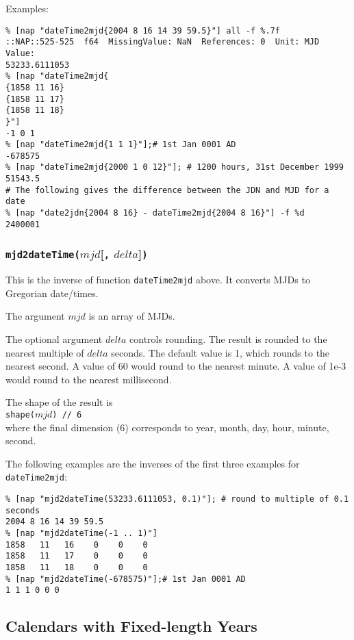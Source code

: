 Examples:
      \begin{verbatim}
% [nap "dateTime2mjd{2004 8 16 14 39 59.5}"] all -f %.7f
::NAP::525-525  f64  MissingValue: NaN  References: 0  Unit: MJD
Value:
53233.6111053
% [nap "dateTime2mjd{
{1858 11 16}
{1858 11 17}
{1858 11 18}
}"]
-1 0 1
% [nap "dateTime2mjd{1 1 1}"];# 1st Jan 0001 AD
-678575
% [nap "dateTime2mjd{2000 1 0 12}"]; # 1200 hours, 31st December 1999
51543.5
# The following gives the difference between the JDN and MJD for a date
% [nap "date2jdn{2004 8 16} - dateTime2mjd{2004 8 16}"] -f %d
2400001
\end{verbatim}

\subsubsection{\texttt{mjd2dateTime(}$mjd$[\texttt{,} $delta$]\texttt{)}}
        \label{date-function-mjd2dateTime}

This is the inverse of function 
      \texttt{dateTime2mjd} above. It converts MJDs to Gregorian
      date/times.
      

The argument 
      $mjd$ is an array of MJDs.
      

The optional argument 
      $delta$ controls rounding. The result is rounded to the
      nearest multiple of 
      $delta$ seconds. The default value is 1, which rounds to
      the nearest second. A value of 60 would round to the nearest
      minute. A value of 1e-3 would round to the nearest
      millisecond.
      

The shape of the result is
      \\
      \texttt{shape($mjd$) // 6}
      \\where the final dimension (6) corresponds to year, month,
      day, hour, minute, second.
      

The following examples are the inverses of the first three
      examples for 
      \texttt{dateTime2mjd}:
      \begin{verbatim}
% [nap "mjd2dateTime(53233.6111053, 0.1)"]; # round to multiple of 0.1 seconds
2004 8 16 14 39 59.5
% [nap "mjd2dateTime(-1 .. 1)"]
1858   11   16    0    0    0
1858   11   17    0    0    0
1858   11   18    0    0    0
% [nap "mjd2dateTime(-678575)"];# 1st Jan 0001 AD
1 1 1 0 0 0
\end{verbatim}

\subsection{Calendars with Fixed-length Years}
        \label{date-function-fixed-years}

